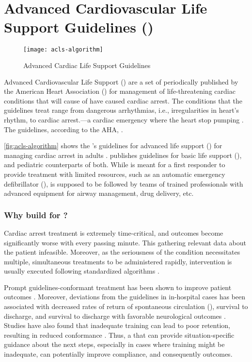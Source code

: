 \section{Advanced Cardiovascular Life Support Guidelines (\ACLS{})}\label{sec:acls}

\begin{figure}[t!]
  \centering
  \texttt{[image: acls-algorithm]}
  \caption{Advanced Cardiac Life Support Guidelines}\label{fig:acls-algorithm}
\end{figure}

Advanced Cardiovascular Life Support (\ACLS{}) are a set of \BPGs{} periodically
published by the American Heart Association (\AHA{}) for management of
life-threatening cardiac conditions that will cause of have caused cardiac
arrest. The conditions that the guidelines treat range from dangerous arrhythmias, i.e.,
irregularities in heart's rhythm, to cardiac arrest.---a cardiac emergency where
the heart stop pumping \cite{ACLSWikiEntry}.
The guidelines, according to the AHA{},  \cite{ACLSUrl}.

\autoref{fig:acls-algorithm} shows the \AHA{}'s guidelines for advanced
life support (\ALS{}) for managing cardiac arrest in adults \cite{ACLSGuidelineUrl}.
\AHA{} publishes guidelines
for basic life support (\BLS{}), and pediatric counterparts of both. While
\BLS{} is meant for a first responder to provide treatment with
limited resources, such as an automatic emergency defibrillator (\AED{}),
\ACLS{} is supposed to be followed by teams of
trained professionals with advanced equipment for airway management,
drug delivery, etc.

\subsubsection{Why build \CDSSs{} for \ACLS{}?}

Cardiac arrest treatment is extremely time-critical, and outcomes
become significantly worse with every passing minute. This
gathering relevant data about the patient infeasible. Moreover, as
the seriousness of the condition necessitates multiple, simultaneous treatments
to be administered rapidly, intervention is usually executed following
standardized \ACLS{} algorithms \cite{ACLSWikiEntry}.

Prompt \ACLS{} guidelines-conformant treatment has been
shown to improve patient outcomes \cite{HonarmandResuscitation18}.
Moreover, deviations from the guidelines in in-hospital cases has been
associated with decreased rates of return of spontaneous circulation (\ROSC{}),
survival to discharge, and survival to discharge with favorable neurological
outcomes \cite{CrowleyResuscitation20}. Studies have also found that
inadequate \ACLS{} training can lead to poor retention, resulting
in reduced \ACLS{} conformance \cite{KiddJCN07}. Thus,
a \CDSS{} that can provide situation-specific guidance about
the next steps, especially in cases where \HCP{} training might be inadequate,
can potentially improve compliance, and consequently outcomes.

